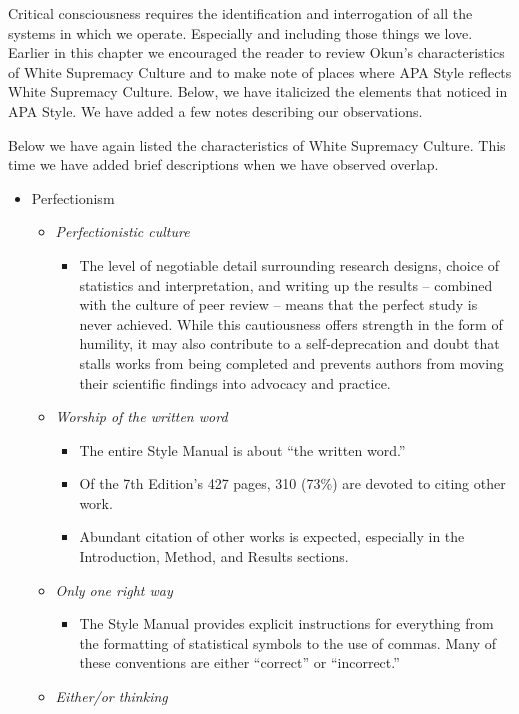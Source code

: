 \documentclass[
  11pt,
]{book}
\providecommand{\tightlist}{%
  \setlength{\itemsep}{0pt}\setlength{\parskip}{0pt}}
\begin{document}
Critical consciousness requires the identification and interrogation of all the systems in which we operate. Especially and including those things we love. Earlier in this chapter we encouraged the reader to review Okun's \citeyearpar{okun_white_2021} characteristics of White Supremacy Culture and to make note of places where APA Style reflects White Supremacy Culture. Below, we have italicized the elements that noticed in APA Style. We have added a few notes describing our observations.

Below we have again listed the characteristics of White Supremacy Culture. This time we have added brief descriptions when we have observed overlap.

\begin{itemize}
\tightlist
\item
  Perfectionism

  \begin{itemize}
  \tightlist
  \item
    \emph{Perfectionistic culture}

    \begin{itemize}
    \tightlist
    \item
      The level of negotiable detail surrounding research designs, choice of statistics and interpretation, and writing up the results -- combined with the culture of peer review -- means that the perfect study is never achieved. While this cautiousness offers strength in the form of humility, it may also contribute to a self-deprecation and doubt that stalls works from being completed and prevents authors from moving their scientific findings into advocacy and practice.
    \end{itemize}
  \item
    \emph{Worship of the written word}

    \begin{itemize}
    \tightlist
    \item
      The entire Style Manual is about ``the written word.''
    \item
      Of the 7th Edition's 427 pages, 310 (73\%) are devoted to citing other work.
    \item
      Abundant citation of other works is expected, especially in the Introduction, Method, and Results sections.
    \end{itemize}
  \item
    \emph{Only one right way}

    \begin{itemize}
    \tightlist
    \item
      The Style Manual provides explicit instructions for everything from the formatting of statistical symbols to the use of commas. Many of these conventions are either ``correct'' or ``incorrect.''
    \end{itemize}
  \item
    \emph{Either/or thinking}


\end{itemize}
\end{itemize}
\end{document}
